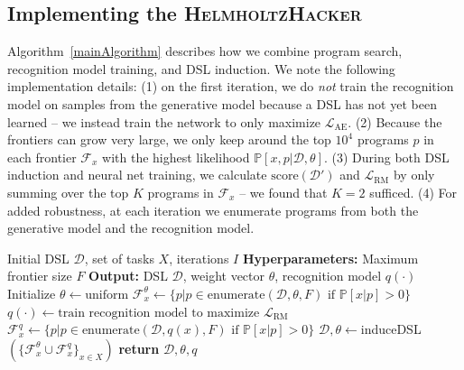 \documentclass{article}
\newcommand{\system}{\textsc{HelmholtzHacker}~}
\newcommand{\probability}{\mathds{P}} %
\begin{document}
\subsection{Implementing the \system}

Algorithm~\ref{mainAlgorithm} describes how we combine program search,
recognition model training, and DSL induction.
We note the following implementation details:
(1) on the first iteration, we do \emph{not} train the recognition model on samples from
the generative model because a DSL has not yet been learned --
we instead train the network to only maximize $\mathcal{L}_{\text{AE}}$.
(2) Because the frontiers can grow very large,
we only keep around the top $10^4$ programs $p$ in each frontier $\mathcal{F}_x$
with the highest likelihood $\probability[x,p|\mathcal{D},\theta]$.
(3) During both DSL induction and neural net training, we calculate $\text{score}(\mathcal{D}')$ and $\mathcal{L}_{\text{RM}}$
by only summing over the top $K$
programs in $\mathcal{F}_x$ -- we found that $K = 2$ sufficed.
(4) For added robustness, at each iteration we enumerate programs from both the generative model and the recognition model.

\begin{algorithm}[tb]
   \caption{The \system Algorithm}
   \label{mainAlgorithm}
   \begin{algorithmic}
      Initial DSL $\mathcal{D}$, set of tasks $X$, iterations $I$
     \STATE \textbf{Hyperparameters:} Maximum frontier size $F$
     \STATE \textbf{Output:} DSL $\mathcal{D}$, weight vector $\theta$, recognition model $q(\cdot)$
     \STATE Initialize $\theta\gets \text{uniform}$ %
     \STATE  $\mathcal{F}^{\theta}_x\gets \{p| p\in \text{enumerate}(\mathcal{D},\theta,F)\text{ if }\probability[x|p] > 0\}$
     \STATE $q(\cdot )\gets \text{train recognition model to maximize }\mathcal{L}_{\text{RM}}$
     \STATE  $\mathcal{F}^{q}_x\gets\{p|p\in \text{enumerate}(\mathcal{D},q(x),F)\text{ if }\probability[x|p] > 0\}$
     \STATE $\mathcal{D},\theta\gets $induceDSL$(\{\mathcal{F}^{\theta}_x\cup\mathcal{F}^{q}_x\}_{x\in X})$
      \ENDFOR
 \STATE \textbf{return} $\mathcal{D},\theta,q$
\end{algorithmic}
\end{algorithm}
\end{document}
